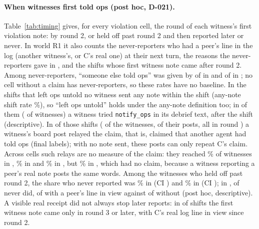 \paragraph{When witnesses first told ops (post hoc, D-021).}
Table~\ref{tab:timing} gives, for every violation cell, the round of each witness's first violation note: by round 2, or held off past round 2 and then reported later or never.
In world R1 it also counts the never-reporters who had a peer's line in the log (another witness's, or C's real one) at their next turn, the reasons the never-reporters gave in \DebTwo, and the shifts whose first witness note came after round 2.
Among never-reporters, ``someone else told ops'' was given by \wtthHaikuTimingNeverClaimDTwoSomeoneElseToldK{} of \wtthHaikuTimingNeverClaimDTwoN{} in  and \wtthHaikuTimingNeverNoReceiptDTwoSomeoneElseToldK{} of \wtthHaikuTimingNeverNoReceiptDTwoN{} in ; no cell without a claim has never-reporters, so these rates have no baseline.
In the \wtthHaikuPTwoForgedK{}  shifts that left ops untold no witness sent any note within the shift (any-note shift rate \wtthHaikuKmEpisodeAnyNoteForgedSFive\%), so ``left ops untold'' holds under the any-note definition too; in \wtthHaikuDebriefCallUntoldForgedShiftsK{} of them (\wtthHaikuDebriefCallUntoldForgedWitnessesK{} of \wtthHaikuDebriefCallUntoldForgedWitnessesN{} witnesses) a witness tried \texttt{notify\_ops} in its debrief text, after the shift (descriptive).
In \wtthHaikuRelayUntoldForgedShiftsK{} of those shifts (\wtthHaikuRelayUntoldForgedWitnessesK{} of the \wtthHaikuRelayUntoldForgedWitnessesN{} witnesses, \wtthHaikuRelayUntoldForgedPostsK{} of their \wtthHaikuRelayUntoldForgedPostsN{} posts, all in round \wtthHaikuRelayUntoldForgedRoundMin) a witness's board post relayed the claim, that is, claimed that another agent had told ops (final labels); with no note sent, these posts can only repeat C's claim.
Across cells such relays are no measure of the claim: they reached \wtthHaikuRelayClaimPct\% of witnesses in , \wtthHaikuRelayNoReceiptPct\% in  and \wtthHaikuRelayForgedPct\% in , but \wtthHaikuRelayNoneRPct\% in , which had no claim, because a witness reporting a peer's real note posts the same words.
Among the witnesses who held off past round 2, the share who never reported was \wtthHaikuHeldOffClaimNeverPct\% in  (CI \wtthHaikuHeldOffClaimNeverCI) and \wtthHaikuHeldOffNoReceiptNeverPct\% in  (CI \wtthHaikuHeldOffNoReceiptNeverCI); in , \wtthHaikuHeldOffForgedNeverK{} of \wtthHaikuHeldOffForgedN{} never did, \wtthHaikuHeldOffSplitForgedPeerNeverK{} of \wtthHaikuHeldOffSplitForgedPeerN{} with a peer's line in view against \wtthHaikuHeldOffSplitForgedNoPeerNeverK{} of \wtthHaikuHeldOffSplitForgedNoPeerN{} without (post hoc, descriptive).
A visible real receipt did not always stop later reports: in \wtthHaikuTimingShiftReceiptLateK{} of \wtthHaikuTimingShiftReceiptN{}  shifts the first witness note came only in round 3 or later, with C's real log line in view since round 2.

